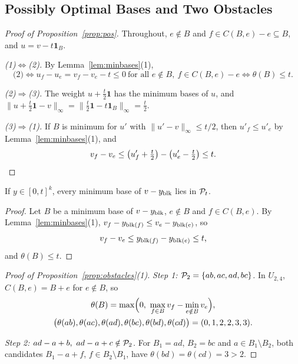 \subsection{Possibly Optimal Bases and Two Obstacles}
\label{app:pos}

\begin{proof}[Proof of Proposition~\ref{prop:pos}]
Throughout, $e\notin B$ and $f\in C(B,e)-e\subseteq B$, and $u=v-t\mathbf 1_B$.

\emph{(1)$\Leftrightarrow$(2).}  By Lemma~\ref{lem:minbases}(1),
\[
  \text{(2)}\iff u_f-u_e=v_f-v_e-t\le0\ \text{for all }e\notin B,\ f\in C(B,e)-e\iff\theta(B)\le t.
\]

\emph{(2)$\Rightarrow$(3).}  The weight $u+\tfrac t2\mathbf 1$ has the minimum
bases of $u$, and
$\|u+\tfrac t2\mathbf 1-v\|_\infty=\|\tfrac t2\mathbf 1-t\mathbf 1_B\|_\infty=\tfrac t2$.

\emph{(3)$\Rightarrow$(1).}  If $B$ is minimum for $u'$ with
$\|u'-v\|_\infty\le t/2$, then $u'_f\le u'_e$ by Lemma~\ref{lem:minbases}(1), and
\[
  v_f-v_e\le\bigl(u'_f+\tfrac t2\bigr)-\bigl(u'_e-\tfrac t2\bigr)\le t.\qedhere
\]
\end{proof}

\begin{lemma}
\label{lem:path}
If $y\in[0,t]^{k}$, every minimum base of $v-y_{\operatorname{blk}}$ lies in $\mathcal P_t$.
\end{lemma}

\begin{proof}
Let $B$ be a minimum base of $v-y_{\operatorname{blk}}$, $e\notin B$ and $f\in C(B,e)$.  By
Lemma~\ref{lem:minbases}(1), $v_f-y_{\operatorname{blk}(f)}\le v_e-y_{\operatorname{blk}(e)}$, so
\[
  v_f-v_e\le y_{\operatorname{blk}(f)}-y_{\operatorname{blk}(e)}\le t,
\]
and $\theta(B)\le t$.
\end{proof}

\begin{proof}[Proof of Proposition~\ref{prop:obstacles}(1)]
\emph{Step 1: $\mathcal P_2=\{ab,ac,ad,bc\}$.}  In $U_{2,4}$, $C(B,e)=B+e$ for
$e\notin B$, so
\[
  \begin{gathered}
  \theta(B)=\max\Bigl(0,\ \max_{f\in B}v_f-\min_{e\notin B}v_e\Bigr),\\
  \bigl(\theta(ab),\theta(ac),\theta(ad),\theta(bc),\theta(bd),\theta(cd)\bigr)=(0,1,2,2,3,3).
  \end{gathered}
\]

\emph{Step 2: $ad-a+b,\ ad-a+c\notin\Pos_2$.}  For $B_1=ad$, $B_2=bc$ and
$a\in B_1\setminus B_2$, both candidates $B_1-a+f$, $f\in B_2\setminus B_1$, have
$\theta(bd)=\theta(cd)=3>2$.
\end{proof}


